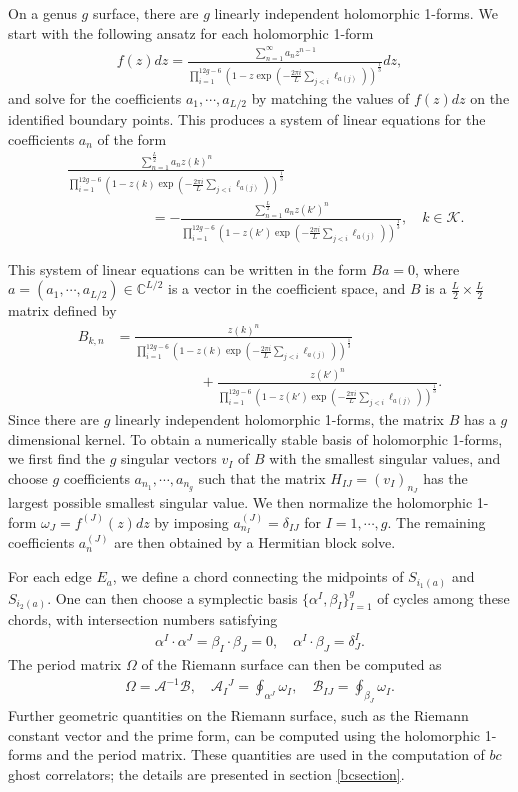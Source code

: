 \documentclass[12pt]{article}
\def\ie{\begin{equation}\begin{aligned}}
\def\fe{\end{aligned}\end{equation}}
\numberwithin{equation}{section}
\begin{document}
On a genus $g$ surface, there are $g$ linearly independent holomorphic 1-forms. We start with the following ansatz for each holomorphic 1-form
\ie \label{fzdz}
f(z)dz= \frac{\sum_{n=1}^\infty a_n z^{n-1}}{\prod_{i=1}^{12g-6}\left(1-z\exp\left({-\frac{2\pi i}{L}\sum_{j<i}\ell_{a(j)}}\right)\right)^{\frac{1}{3}}}dz,
\fe
and solve for the coefficients $a_1,\cdots, a_{L/2}$ by matching the values of $f(z)dz$ on the identified boundary points. This produces a system of linear equations for the coefficients $a_n$ of the form
\ie
&\frac{\sum_{n=1}^{\frac{L}{2}} a_n z(k)^{n}}{\prod_{i=1}^{12g-6}\left(1-z(k)\exp\left({-\frac{2\pi i}{L}\sum_{j<i}\ell_{a(j)}}\right)\right)^{\frac{1}{3}}}\\&\qquad \qquad \qquad = - \frac{\sum_{n=1}^{\frac{L}{2}} a_n z(k')^{n}}{\prod_{i=1}^{12g-6}\left(1-z(k')\exp\left({-\frac{2\pi i}{L}\sum_{j<i}\ell_{a(j)}}\right)\right)^{\frac{1}{3}}},\quad k \in \mathcal{K}.
\fe

This system of linear equations can be written in the form $Ba=0$, where $a=(a_1,\cdots, a_{L/2})\in \mathbb{C}^{L/2}$ is a vector in the coefficient space, and $B$ is a $\tfrac{L}{2}\times \tfrac{L}{2}$ matrix defined by
\ie
B_{k,n} &= \frac{z(k)^{n}}{\prod_{i=1}^{12g-6}\left(1-z(k)\exp\left({-\frac{2\pi i}{L}\sum_{j<i}\ell_{a(j)}}\right)\right)^{\frac{1}{3}}}\\
&\qquad \qquad \qquad + \frac{z(k')^{n}}{\prod_{i=1}^{12g-6}\left(1-z(k')\exp\left({-\frac{2\pi i}{L}\sum_{j<i}\ell_{a(j)}}\right)\right)^{\frac{1}{3}}}.
\fe
Since there are $g$ linearly independent holomorphic 1-forms, the matrix $B$ has a $g$ dimensional kernel. To obtain a numerically stable basis of holomorphic 1-forms, we first find the $g$ singular vectors $v_I$ of $B$ with the smallest singular values, and choose $g$ coefficients $a_{n_1},\cdots, a_{n_g}$ such that the matrix $H_{IJ}=(v_I)_{n_J}$ has the largest possible smallest singular value. We then normalize the holomorphic 1-form $\omega_J=f^{(J)}(z)dz$ by imposing $a^{(J)}_{n_I} = \delta_{IJ}$ for $I=1,\cdots,g$. The remaining coefficients $a^{(J)}_n$ are then obtained by a Hermitian block solve.

For each edge $E_a$, we define a chord connecting the midpoints of $S_{i_1(a)}$ and $S_{i_2(a)}$. One can then choose a symplectic basis $\{\alpha^I, \beta_I\}_{I=1}^g$ of cycles among these chords, with intersection numbers satisfying
\ie
\alpha^I\cdot \alpha^J = \beta_I\cdot \beta_J = 0,\quad \alpha^I\cdot \beta_J= \delta^{I}_J.
\fe
The period matrix $\Omega$ of the Riemann surface can then be computed as
\ie \label{periodmatrix}
\Omega=\mathcal{A}^{-1}\mathcal{B},\quad \mathcal{A}_{I}{}^J=\oint_{\alpha^J}\omega_I,\quad \mathcal{B}_{IJ}=\oint_{\beta_J} \omega_I.
\fe
Further geometric quantities on the Riemann surface, such as the Riemann constant vector and the prime form, can be computed using the holomorphic 1-forms and the period matrix. These quantities are used in the computation of $bc$ ghost correlators; the details are presented in section \ref{bcsection}.
\end{document}
